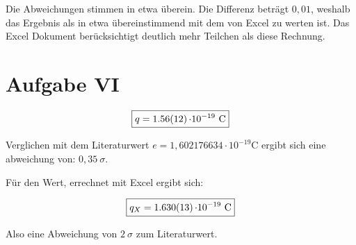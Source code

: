 Die Abweichungen stimmen in etwa überein. Die Differenz beträgt $0,01 $, weshalb das Ergebnis als in etwa übereinstimmend mit dem von Excel zu werten ist.
Das Excel Dokument berücksichtigt deutlich mehr Teilchen als diese Rechnung.

\section{Aufgabe VI}


\[\boxed{q = \SI{1,56 \pm 0.12}{\cdot 10^{-19}\ \coulomb}}\]

Verglichen mit dem Literaturwert $e =  1,602 176 634 \cdot 10^{-19} \text{C}$ ergibt sich eine abweichung von:
$0,35\ \sigma$.

Für den Wert, errechnet mit Excel ergibt sich:

\[\boxed{q_X = \SI{1,630 \pm 0.013}{\cdot 10^{-19}\ \coulomb}}\]

Also eine Abweichung von $2\ \sigma$ zum Literaturwert.
